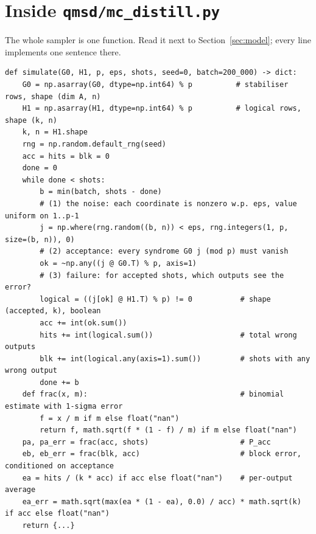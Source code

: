 \documentclass[11pt]{article}
\newcommand{\code}[1]{\texttt{#1}}
\begin{document}
\section{Inside \code{qmsd/mc\_distill.py}}
\label{sec:code}

The whole sampler is one function. Read it next to Section~\ref{sec:model}; every
line implements one sentence there.

\begin{lstlisting}
def simulate(G0, H1, p, eps, shots, seed=0, batch=200_000) -> dict:
    G0 = np.asarray(G0, dtype=np.int64) % p          # stabiliser rows, shape (dim A, n)
    H1 = np.asarray(H1, dtype=np.int64) % p          # logical rows,    shape (k, n)
    k, n = H1.shape
    rng = np.random.default_rng(seed)
    acc = hits = blk = 0
    done = 0
    while done < shots:
        b = min(batch, shots - done)
        # (1) the noise: each coordinate is nonzero w.p. eps, value uniform on 1..p-1
        j = np.where(rng.random((b, n)) < eps, rng.integers(1, p, size=(b, n)), 0)
        # (2) acceptance: every syndrome G0 j (mod p) must vanish
        ok = ~np.any((j @ G0.T) % p, axis=1)
        # (3) failure: for accepted shots, which outputs see the error?
        logical = ((j[ok] @ H1.T) % p) != 0           # shape (accepted, k), boolean
        acc += int(ok.sum())
        hits += int(logical.sum())                    # total wrong outputs
        blk += int(logical.any(axis=1).sum())         # shots with any wrong output
        done += b
    def frac(x, m):                                   # binomial estimate with 1-sigma error
        f = x / m if m else float("nan")
        return f, math.sqrt(f * (1 - f) / m) if m else float("nan")
    pa, pa_err = frac(acc, shots)                     # P_acc
    eb, eb_err = frac(blk, acc)                       # block error, conditioned on acceptance
    ea = hits / (k * acc) if acc else float("nan")    # per-output average
    ea_err = math.sqrt(max(ea * (1 - ea), 0.0) / acc) * math.sqrt(k) if acc else float("nan")
    return {...}
\end{lstlisting}
\end{document}
